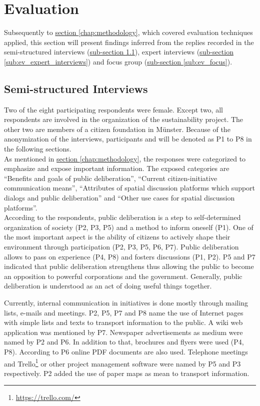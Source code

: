 \section{Evaluation}
\label{chap:evaluation}
Subsequently to \hyperref[chap:methodology]{section \ref{chap:methodology}}, which covered evaluation techniques applied, this section will present findings inferred from the replies recorded in the semi-structured interviews (\hyperref[sub:ev_interviews]{sub-section \ref{sub:ev_interviews}}), expert interviews (\hyperref[sub:ev_expert_interviews]{sub-section \ref{sub:ev_expert_interviews}}) and focus group (\hyperref[sub:ev_focus]{sub-section \ref{sub:ev_focus}}).


\subsection{Semi-structured Interviews}
\label{sub:ev_interviews}
Two of the eight participating respondents were female. Except two, all respondents are involved in the organization of the sustainability project. The other two are members of a citizen foundation in M{\"u}nster. Because of the anonymization of the interviews, participants and will be denoted as P1 to P8 in the following sections.\\
As mentioned in \hyperref[chap:methodology]{section \ref{chap:methodology}}, the responses were categorized to emphasize and expose important information. The exposed categories are ``Benefits and goals of public deliberation'', ``Current citizen-initiative communication means'', ``Attributes of spatial discussion platforms which support dialogs and public deliberation'' and ``Other use cases for spatial discussion platforms''.\\ %

According to the respondents, public deliberation is a step to self-determined organization of society (P2, P3, P5) and a method to inform oneself (P1). One of the most important aspect is the ability of citizens to actively shape their environment through participation (P2, P3, P5, P6, P7). Public deliberation allows to pass on experience (P4, P8) and fosters discussions (P1, P2). P5 and P7 indicated that public deliberation strengthens thus allowing the public to become an opposition to powerful corporations and the government. Generally, public deliberation is understood as an act of doing useful things together.

Currently, internal communication in initiatives is done mostly through mailing lists, e-mails and meetings. P2, P5, P7 and P8 name the use of Internet pages with simple lists and texts to transport information to the public. A wiki web application was mentioned by P7. Newspaper advertisements as medium were named by P2 and P6. In addition to that, brochures and flyers were used (P4, P8). According to P6 online PDF documents are also used. Telephone meetings and Trello\footnote{\url{https://trello.com/}} or other project management software were named by P5 and P3 respectively. P2 added the use of paper maps as mean to transport information.

